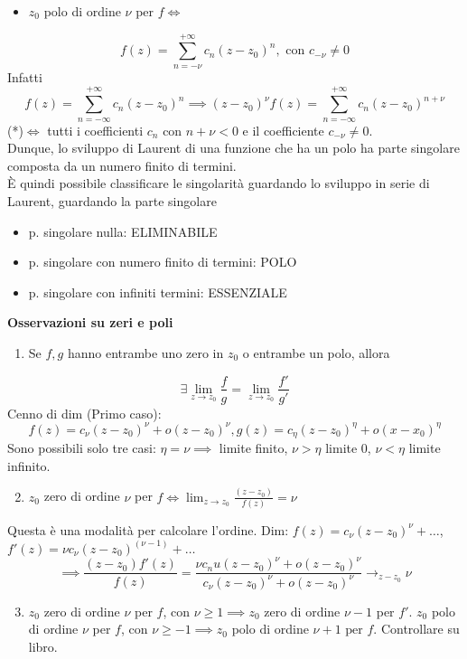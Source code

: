 \begin{itemize}
	\item $z_0$ polo di ordine $\nu$ per $f \iff$
\end{itemize}
\[f(z)=\sum_{n=-\nu}^{+\infty} c_n(z-z_0)^n,\text{ con }c_{-\nu}\neq 0\]
Infatti 
\[f(z)=\sum_{n=-\infty}^{+\infty} c_n(z-z_0)^n\implies(z-z_0)^\nu f(z)=\sum_{n=-\infty}^{+\infty} c_n(z-z_0)^{n+\nu}\]
(*)$\iff$ tutti i coefficienti $c_n$ con $n+\nu<0$ e il coefficiente $c_{-\nu}\neq 0$.
\\Dunque, lo sviluppo di Laurent di una funzione che ha un polo ha parte singolare composta da un numero finito di termini.
\\È quindi possibile classificare le singolarità guardando lo sviluppo in serie di Laurent, guardando la parte singolare
\begin{itemize}
	\item p. singolare nulla: ELIMINABILE
	\item p. singolare con numero finito di termini: POLO
	\item p. singolare con infiniti termini: ESSENZIALE
\end{itemize}
\textbf{Osservazioni su zeri e poli} 
\begin{enumerate}
	\item Se $f,g$ hanno entrambe uno zero in $z_0$ o entrambe un polo, allora
\end{enumerate}
\[\exists  \lim_{z \to z_0} \frac{f}{g}=\lim_{z \to z_0} \frac{f'}{g'}\]
Cenno di dim (Primo caso):
\[f(z)=c_\nu(z-z_0)^\nu+o(z-z_0)^\nu, g(z)=c_\eta(z-z_0)^\eta+o(x-x_0)^\eta\]
Sono possibili solo tre casi: $\eta=\nu\implies$ limite finito, $\nu>\eta$ limite 0, $\nu < \eta$ limite infinito.
\begin{enumerate}
	\setcounter{enumi}{1}
	\item $z_0$ zero di ordine $\nu$ per $f \iff \lim_{z \to z_0} \frac{(z-z_0)}{f(z)}=\nu$
		\\
\end{enumerate}
Questa è una modalità per calcolare l'ordine.
Dim: $f(z)=c_\nu(z-z_0)^\nu+\ldots$, $f'(z)=\nu c_\nu(z-z_0)^{(\nu-1)}+\ldots$
\[\implies \frac{(z-z_0)f'(z)}{f(z)}=\frac{\nu c_nu(z-z_0)^\nu+o(z-z_0)^\nu}{c_\nu(z-z_0)^\nu+o(z-z_0)^\nu}\to_{z-z_0}\nu\]
\begin{enumerate}
	\setcounter{enumi}{2}
	\item $z_0$ zero di ordine $\nu$ per $f$, con $\nu \ge 1\implies z_0$ zero di ordine $\nu-1$ per $f'$.
$z_0$ polo di ordine $\nu$ per $f$, con $\nu \ge -1\implies z_0$ polo di ordine $\nu+1\text{ per }f$.
Controllare su libro.
\end{enumerate} 
